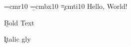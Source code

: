  
\font\a=cmr10 \font\b=cmbx10 \font\c=cmti10
\nopagenumbers
\a Hello, World!\par \b Bold Text\par \c Italic gly\par
\bye
